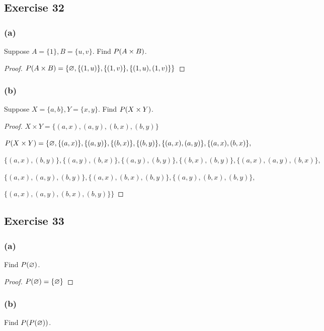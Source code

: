 \documentclass[14pt]{extarticle}
\let\mathscr\relax
\newcommand{\ps}{\mathscr{P}}
\newcommand{\es}{\varnothing}
\begin{document}
\subsection{Exercise 32}

\subsubsection{(a)}
Suppose \(A = \{1\}, B = \{u, v\}\). Find \(\ps(A \times B)\).

\begin{proof}
\(\ps(A \times B) = \{\es, \{(1, u)\}, \{(1, v)\}, \{(1, u), (1, v)\}\}\)
\end{proof}

\subsubsection{(b)}
Suppose \(X = \{a, b\}, Y = \{x, y\}\). Find \(\ps(X \times Y)\).

\begin{proof}
\(X \times Y = \{(a, x), (a, y), (b, x), (b, y)\}\)

\(\ps(X \times Y) = \{\es, \{(a, x)\}, \{(a, y)\}, \{(b, x)\}, \{(b, y)\}, \{(a, x), (a, y)\}, \{(a, x), (b, x)\},\)

\(\{(a, x), (b, y)\}, \{(a, y), (b, x)\}, \{(a, y), (b, y)\}, \{(b, x), (b, y)\}, \{(a, x), (a, y), (b, x)\},\) 

\(\{(a, x), (a, y), (b, y)\}, \{(a, x), (b, x), (b, y)\}, \{(a, y), (b, x), (b, y)\},\) 

\(\{(a, x), (a, y), (b, x), (b, y)\}\}\)
\end{proof}

\subsection{Exercise 33}

\subsubsection{(a)}
Find \(\ps(\es)\).

\begin{proof}
\(\ps(\es) = \{\es\}\)
\end{proof}

\subsubsection{(b)}
Find \(\ps(\ps(\es))\).
\end{document}
